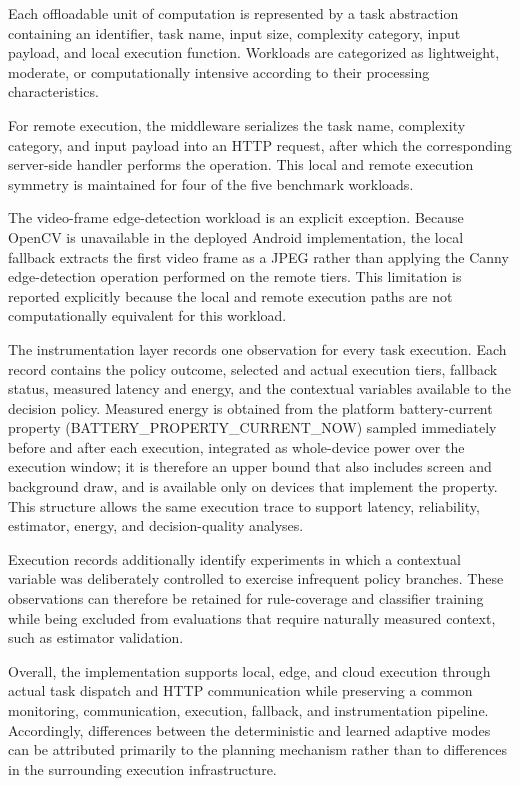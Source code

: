 Each offloadable unit of computation is represented by a task abstraction
containing an identifier, task name, input size, complexity category, input
payload, and local execution function. Workloads are categorized as
lightweight, moderate, or computationally intensive according to their
processing characteristics.

For remote execution, the middleware serializes the task name, complexity
category, and input payload into an HTTP request, after which the corresponding
server-side handler performs the operation. This local and remote execution
symmetry is maintained for four of the five benchmark workloads.

The video-frame edge-detection workload is an explicit exception. Because
OpenCV is unavailable in the deployed Android implementation, the local
fallback extracts the first video frame as a JPEG rather than applying the
Canny edge-detection operation performed on the remote tiers. This limitation
is reported explicitly because the local and remote execution paths are not
computationally equivalent for this workload.

The instrumentation layer records one observation for every task execution.
Each record contains the policy outcome, selected and actual execution tiers,
fallback status, measured latency and energy, and the contextual variables
available to the decision policy. Measured energy is obtained from the platform
battery-current property (BATTERY\_PROPERTY\_CURRENT\_NOW) sampled immediately
before and after each execution, integrated as whole-device power over the
execution window; it is therefore an upper bound that also includes screen and
background draw, and is available only on devices that implement the property.
This structure allows the same execution trace to support latency, reliability,
estimator, energy, and decision-quality analyses.

Execution records additionally identify experiments in which a contextual
variable was deliberately controlled to exercise infrequent policy branches.
These observations can therefore be retained for rule-coverage and classifier
training while being excluded from evaluations that require naturally measured
context, such as estimator validation.

Overall, the implementation supports local, edge, and cloud execution through
actual task dispatch and HTTP communication while preserving a common
monitoring, communication, execution, fallback, and instrumentation pipeline.
Accordingly, differences between the deterministic and learned adaptive modes
can be attributed primarily to the planning mechanism rather than to
differences in the surrounding execution infrastructure.
